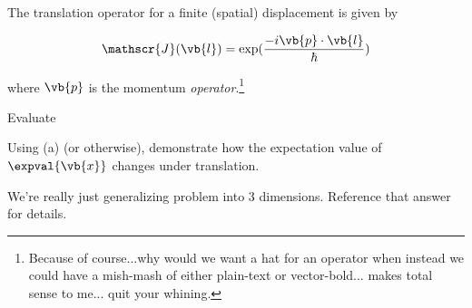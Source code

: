 \begin{question}
  The translation operator for a finite (spatial) displacement is given by

  \begin{equation*}
    \mathscr{J}(\vb{l}) = \exp(\frac{-i\vb{p}\cdot\vb{l}}{\hbar})
    \end{equation*}

  where $\vb{p}$ is the momentum \emph{operator}.\footnote{Because of
  course...why would we want a hat for an operator when instead we
  could have a mish-mash of either plain-text or vector-bold... makes
  total sense to me... quit your whining.}
  
  \begin{questionpart}
    Evaluate
    \begin{equation*}
      [x_i, \mathscr{J}(\vb{l})]
    \end{equation*}
  \end{questionpart}

  \begin{questionpart}
    Using (a) (or otherwise), demonstrate how the expectation value of
    $\expval{\vb{x}}$ changes under translation.
  \end{questionpart}
\end{question}

\begin{purpose}
  We're really just generalizing problem 
  into 3 dimensions.  Reference that answer for details.
\end{purpose}

